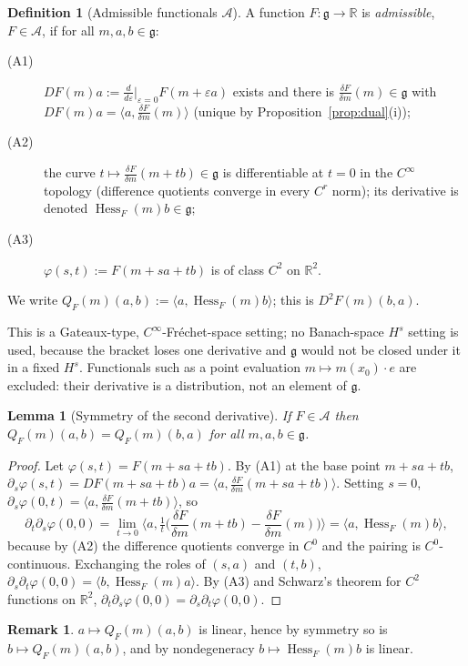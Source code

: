 \documentclass[11pt]{article}
\newtheorem{lemma}[theorem]{Lemma}
\theoremstyle{definition}
\newtheorem{definition}[theorem]{Definition}
\newtheorem{remark}[theorem]{Remark}
\newcommand{\R}{\mathbb{R}}
\newcommand{\g}{\mathfrak{g}}
\newcommand{\ip}[2]{\langle #1,#2\rangle}
\newcommand{\Hess}{\operatorname{Hess}}
\newcommand{\dF}[1]{\frac{\delta #1}{\delta m}}
\begin{document}
\begin{definition}[Admissible functionals $\mathcal A$]\label{def:adm}
A function $F:\g\to\R$ is \emph{admissible}, $F\in\mathcal A$, if for all $m,a,b\in\g$:
\begin{description}
\item[(A1)] $DF(m)a:=\frac{d}{d\varepsilon}\big|_{\varepsilon=0}F(m+\varepsilon a)$ exists and there is
$\dF{F}(m)\in\g$ with $DF(m)a=\ip{a}{\dF{F}(m)}$ (unique by Proposition~\ref{prop:dual}(i));
\item[(A2)] the curve $t\mapsto\dF{F}(m+tb)\in\g$ is differentiable at $t=0$ in the $C^\infty$
topology (difference quotients converge in every $C^r$ norm); its derivative is denoted
$\Hess_F(m)b\in\g$;
\item[(A3)] $\varphi(s,t):=F(m+sa+tb)$ is of class $C^2$ on $\R^2$.
\end{description}
We write $Q_F(m)(a,b):=\ip{a}{\Hess_F(m)b}$; this is $D^2F(m)(b,a)$.
\end{definition}
This is a Gateaux-type, $C^\infty$-Fréchet-space setting; no Banach-space $H^s$ setting is used,
because the bracket loses one derivative and $\g$ would not be closed under it in a fixed $H^s$.
Functionals such as a point evaluation $m\mapsto m(x_0)\cdot e$ are excluded: their derivative is a
distribution, not an element of $\g$.

\begin{lemma}[Symmetry of the second derivative]\label{lem:sym}
If $F\in\mathcal A$ then $Q_F(m)(a,b)=Q_F(m)(b,a)$ for all $m,a,b\in\g$.
\end{lemma}
\begin{proof}
Let $\varphi(s,t)=F(m+sa+tb)$. By (A1) at the base point $m+sa+tb$,
$\partial_s\varphi(s,t)=DF(m+sa+tb)a=\ip{a}{\dF{F}(m+sa+tb)}$. Setting $s=0$,
$\partial_s\varphi(0,t)=\ip{a}{\dF F(m+tb)}$, so
\[
\partial_t\partial_s\varphi(0,0)=\lim_{t\to0}\Big\langle a,\tfrac{1}{t}\big(\dF F(m+tb)-\dF F(m)\big)\Big\rangle
=\ip{a}{\Hess_F(m)b},
\]
because by (A2) the difference quotients converge in $C^0$ and the pairing is $C^0$-continuous.
Exchanging the roles of $(s,a)$ and $(t,b)$, $\partial_s\partial_t\varphi(0,0)=\ip{b}{\Hess_F(m)a}$.
By (A3) and Schwarz's theorem for $C^2$ functions on $\R^2$, $\partial_t\partial_s\varphi(0,0)=\partial_s\partial_t\varphi(0,0)$.
\end{proof}
\begin{remark}
$a\mapsto Q_F(m)(a,b)$ is linear, hence by symmetry so is $b\mapsto Q_F(m)(a,b)$, and by
nondegeneracy $b\mapsto\Hess_F(m)b$ is linear.
\end{remark}
\end{document}
